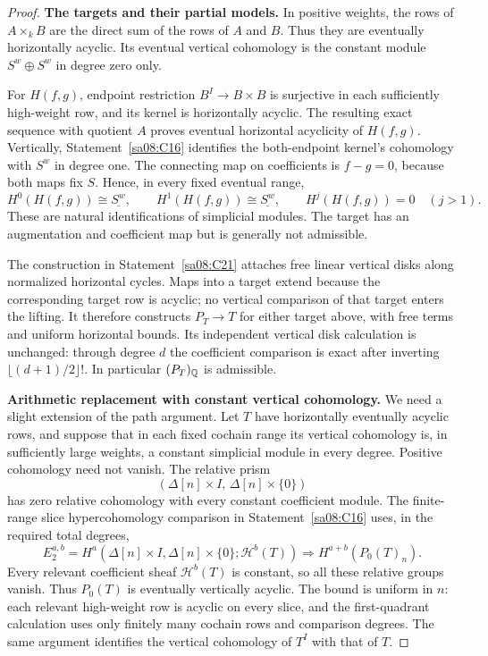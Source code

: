 \begin{proof}
\par\medskip\noindent\textbf{The targets and their partial models.}
In positive weights, the rows of $A\times_k B$ are the direct sum
of the rows of $A$ and $B$. Thus they are eventually horizontally
acyclic. Its eventual vertical cohomology is the constant module
$S^w\oplus S^w$ in degree zero only.

For $H(f,g)$, endpoint restriction $B^I\to B\times B$ is
surjective in each sufficiently high-weight row, and its kernel is
horizontally acyclic. The resulting exact sequence with quotient
$A$ proves eventual horizontal acyclicity of $H(f,g)$. Vertically,
Statement~\ref{sa08:C16} identifies the both-endpoint kernel's
cohomology with $S^w$ in degree one. The connecting map on
coefficients is $f-g=0$, because both maps fix $S$. Hence, in every
fixed eventual range,
\[
 H^0(H(f,g))\cong\underline{S^w},\qquad
 H^1(H(f,g))\cong\underline{S^w},\qquad
 H^j(H(f,g))=0\quad(j>1).
\]
These are natural identifications of simplicial modules. The target
has an augmentation and coefficient map but is generally not
admissible.

The construction in Statement~\ref{sa08:C21} attaches free linear
vertical disks along normalized horizontal cycles. Maps into a target
extend because the corresponding target row is acyclic; no vertical
comparison of that target enters the lifting. It therefore constructs
$P_T\to T$ for either target above, with free terms and uniform
horizontal bounds. Its independent vertical disk calculation is
unchanged: through degree $d$ the coefficient comparison is exact
after inverting $\lfloor(d+1)/2\rfloor!$. In particular
$(P_T)_\mathbb Q$ is admissible.

\par\medskip\noindent\textbf{Arithmetic replacement with constant vertical cohomology.}
We need a slight extension of the path argument. Let $T$ have
horizontally eventually acyclic rows, and suppose that in each fixed
cochain range its vertical cohomology is, in sufficiently large
weights, a constant simplicial module in every degree. Positive
cohomology need not vanish. The relative prism
\[
 (\Delta[n]\times I,\,\Delta[n]\times\{0\})
\]
has zero relative cohomology with every constant coefficient module.
The finite-range slice hypercohomology comparison in
Statement~\ref{sa08:C16} uses, in the required total degrees,
\[
 E_2^{a,b}=H^a(\Delta[n]\times I,
                  \Delta[n]\times\{0\};\mathcal H^b(T))
       \Longrightarrow H^{a+b}(P_0(T)_n).
\]
Every relevant coefficient sheaf $\mathcal H^b(T)$ is constant,
so all these relative groups vanish. Thus $P_0(T)$ is eventually
vertically acyclic. The bound is uniform in $n$:
each relevant high-weight row is acyclic on every slice, and the
first-quadrant calculation uses only finitely many cochain rows and
comparison degrees. The same argument identifies the vertical
cohomology of $T^I$ with that of $T$.


\end{proof}
